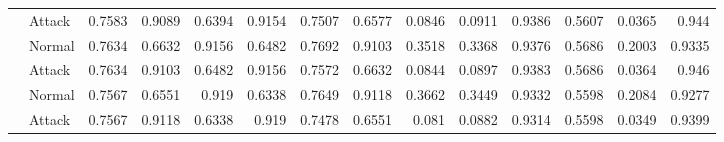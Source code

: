 \begin{tabular}{llrrrrrrrrrrrr}
                & Attack     &     0.7583 &      0.9089 &   0.6394 &        0.9154 &     0.7507 & 0.6577 & 0.0846 & 0.0911 &    0.9386 & 0.5607 & 0.0365 &   0.944  \\
                & Normal     &     0.7634 &      0.6632 &   0.9156 &        0.6482 &     0.7692 & 0.9103 & 0.3518 & 0.3368 &    0.9376 & 0.5686 & 0.2003 &   0.9335 \\
                & Attack     &     0.7634 &      0.9103 &   0.6482 &        0.9156 &     0.7572 & 0.6632 & 0.0844 & 0.0897 &    0.9383 & 0.5686 & 0.0364 &   0.946  \\
                & Normal     &     0.7567 &      0.6551 &   0.919  &        0.6338 &     0.7649 & 0.9118 & 0.3662 & 0.3449 &    0.9332 & 0.5598 & 0.2084 &   0.9277 \\
                & Attack     &     0.7567 &      0.9118 &   0.6338 &        0.919  &     0.7478 & 0.6551 & 0.081  & 0.0882 &    0.9314 & 0.5598 & 0.0349 &   0.9399 \\
\hline
\end{tabular}